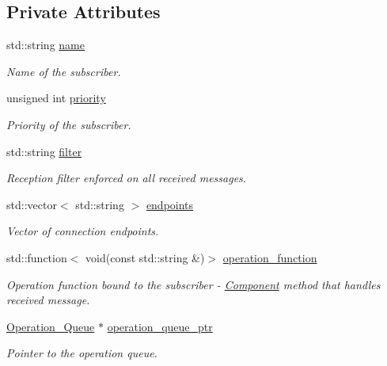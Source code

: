 \subsection*{Private Attributes}
\begin{DoxyCompactItemize}
\item 
std\+::string \hyperlink{classzcm_1_1Subscriber_a2ec3b22204d0f3f72e996b19b086910b}{name}
\begin{DoxyCompactList}\small\item\em Name of the subscriber. \end{DoxyCompactList}\item 
unsigned int \hyperlink{classzcm_1_1Subscriber_a208baedba808c9229887ab8af00725fd}{priority}
\begin{DoxyCompactList}\small\item\em Priority of the subscriber. \end{DoxyCompactList}\item 
std\+::string \hyperlink{classzcm_1_1Subscriber_a28ab0921d97bc4d05ac6bb64c977cc35}{filter}
\begin{DoxyCompactList}\small\item\em Reception filter enforced on all received messages. \end{DoxyCompactList}\item 
std\+::vector$<$ std\+::string $>$ \hyperlink{classzcm_1_1Subscriber_a81590d7017038d6f50073baaa485a1b7}{endpoints}
\begin{DoxyCompactList}\small\item\em Vector of connection endpoints. \end{DoxyCompactList}\item 
std\+::function$<$ void(const std\+::string \&)$>$ \hyperlink{classzcm_1_1Subscriber_aee61c147a26fd83f6e69e5fed48d8221}{operation\+\_\+function}
\begin{DoxyCompactList}\small\item\em Operation function bound to the subscriber -\/ \hyperlink{classzcm_1_1Component}{Component} method that handles received message. \end{DoxyCompactList}\item 
\hyperlink{classzcm_1_1Operation__Queue}{Operation\+\_\+\+Queue} $\ast$ \hyperlink{classzcm_1_1Subscriber_a1cd579aa570832f9656b9fa24747dde3}{operation\+\_\+queue\+\_\+ptr}
\begin{DoxyCompactList}\small\item\em Pointer to the operation queue. \end{DoxyCompactList}\item 

\end{DoxyCompactItemize}
